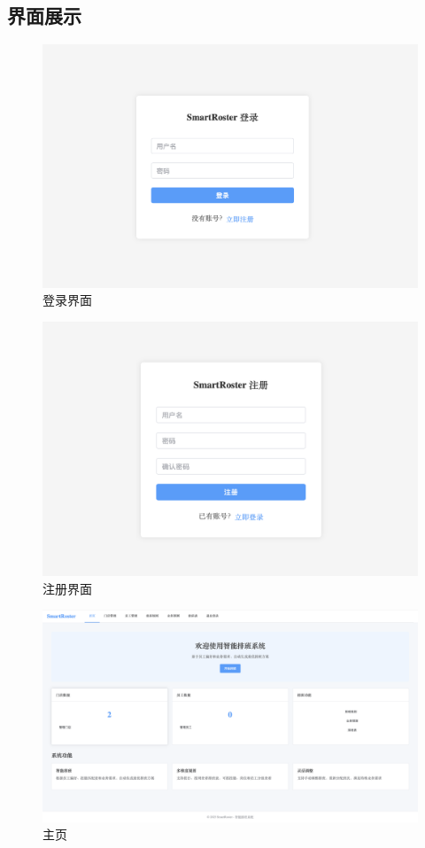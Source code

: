 \documentclass{ctexart}
\begin{document}
\subsection{界面展示}
\begin{figure}[H]
    \centering
    \includegraphics[width=0.8\linewidth]{./source/登录界面.png}
    \caption{登录界面}
\end{figure}
\begin{figure}[H]
    \centering
    \includegraphics[width=0.8\linewidth]{./source/注册界面.png}
    \caption{注册界面}
\end{figure}
\begin{figure}[H]
    \centering
    \includegraphics[width=0.8\linewidth]{./source/主页.png}
    \caption{主页}
\end{figure}
\end{document}
